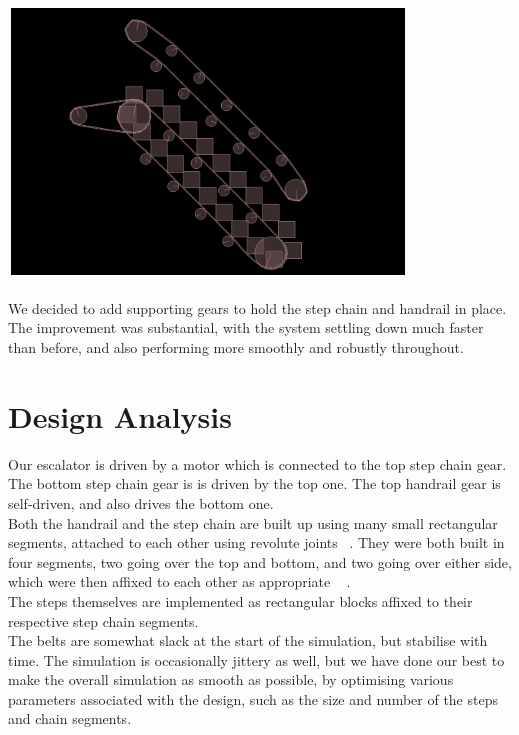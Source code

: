 \documentclass[11pt]{article}
\begin{document}
	\includegraphics[width=300pt, height=200pt]{../plots/improved_simulation.png}\\\\	

	We decided to add supporting gears to hold the step chain and handrail in place. The improvement was substantial, with the system settling down much faster than before, and also performing more smoothly and robustly throughout.

\section{Design Analysis}

	Our escalator is driven by a motor which is connected to the top step chain gear. The bottom step chain gear is is driven by the top one. The top handrail gear is self-driven, and also drives the bottom one.\\
	
	Both the handrail and the step chain are built up using many small rectangular segments, attached to each other using revolute joints
	~\cite{rj}. 
	They were both built in four segments, two going over the top and bottom, and two going over either side, which were then affixed to each other as appropriate
	~\cite{cb}
	.\\
	
	The steps themselves are implemented as rectangular blocks affixed to their respective step chain segments.\\
	
	The belts are somewhat slack at the start of the simulation, but stabilise with time. The simulation is occasionally jittery as well, but we have done our best to make the overall simulation as smooth as possible, by optimising various parameters associated with the design, such as the size and number of the steps and chain segments.\\
\end{document}
